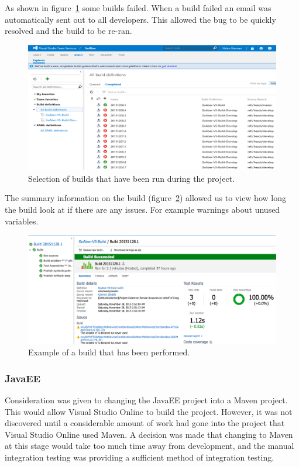 As shown in figure~\ref{fig:testing_vsBuild} some builds failed. When a build failed an email was automatically sent out to all developers. This allowed the bug to be quickly resolved and the build to be re-ran.


\begin{figure}[H]
\begin{center}
\includegraphics[scale=0.3]{images/testing/builds.png} 
\caption{Selection of builds that have been run during the project.}
\label{fig:testing_vsBuild}
\end{center}
\end{figure}

The summary information on the build (figure~\ref{fig:testing_vsBuildExample}) allowed us to view how long the build look at if there are any issues. For example warnings about unused variables.

\begin{figure}[H]
\begin{center}
\includegraphics[scale=0.3]{images/testing/ExampleBuild.png} 
\caption{Example of a build that has been performed.}
\label{fig:testing_vsBuildExample}
\end{center}
\end{figure}

\subsubsection{JavaEE}
Consideration was given to changing the JavaEE project into a Maven project. This would allow Visual Studio Online to build the project. However, it was not discovered until a considerable amount of work had gone into the project that Visual Studio Online used Maven. A decision was made that changing to Maven at this stage would take too much time away from development, and the manual integration testing was providing a sufficient method of integration testing.


